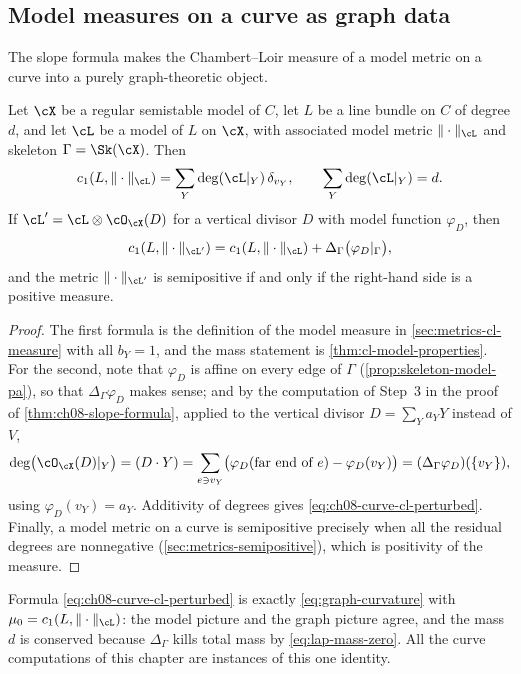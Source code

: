 \subsection{Model measures on a curve as graph data}
\label{sec:ch08-curve-cl}

The slope formula makes the Chambert--Loir measure of a model metric on a
curve into a purely graph-theoretic object.

\begin{proposition}
\label{prop:ch08-curve-cl}
Let $\cX$ be a regular semistable model of $C$, let $L$ be a line bundle on
$C$ of degree $d$, and let $\cL$ be a model of $L$ on $\cX$, with associated
model metric $\|\cdot\|_{\cL}$ and skeleton $\Gamma=\Sk(\cX)$.  Then
\begin{equation}
\label{eq:ch08-curve-cl-measure}
 c_1(L,\|\cdot\|_{\cL})=\sum_Y\deg(\cL|_Y)\,\delta_{v_Y},
 \qquad
 \sum_Y\deg(\cL|_Y)=d .
\end{equation}
If $\cL'=\cL\otimes\cO_\cX(D)$ for a vertical divisor $D$ with model function
$\varphi_D$, then
\begin{equation}
\label{eq:ch08-curve-cl-perturbed}
 c_1(L,\|\cdot\|_{\cL'})
   =c_1(L,\|\cdot\|_{\cL})+\Delta_\Gamma\bigl(\varphi_D|_\Gamma\bigr),
\end{equation}
and the metric $\|\cdot\|_{\cL'}$ is semipositive if and only if the
right-hand side is a positive measure.
\end{proposition}

\begin{proof}
The first formula is the definition of the model measure in
\cref{sec:metrics-cl-measure} with all $b_Y=1$, and the mass statement is
\cref{thm:cl-model-properties}.  For the second, note that $\varphi_D$ is
affine on every edge of $\Gamma$
(\cref{prop:skeleton-model-pa}), so that $\Delta_\Gamma\varphi_D$ makes
sense; and by the computation of Step~3 in the proof of
\cref{thm:ch08-slope-formula}, applied to the vertical divisor
$D=\sum_Ya_YY$ instead of $V$,
\[
 \deg\bigl(\cO_{\cX}(D)|_Y\bigr)=(D\cdot Y)
 =\sum_{e\ni v_Y}\bigl(\varphi_D(\text{far end of }e)-\varphi_D(v_Y)\bigr)
 =(\Delta_\Gamma\varphi_D)(\{v_Y\}) ,
\]
using $\varphi_D(v_Y)=a_Y$.  Additivity of degrees gives
\eqref{eq:ch08-curve-cl-perturbed}.  Finally, a model metric on a curve is
semipositive precisely when all the residual degrees are nonnegative
(\cref{sec:metrics-semipositive}), which is positivity of the measure.
\end{proof}

Formula \eqref{eq:ch08-curve-cl-perturbed} is exactly
\eqref{eq:graph-curvature} with $\mu_0=c_1(L,\|\cdot\|_\cL)$: the model
picture and the graph picture agree, and the mass $d$ is conserved because
$\Delta_\Gamma$ kills total mass by \eqref{eq:lap-mass-zero}.  All the
curve computations of this chapter are instances of this one identity.

